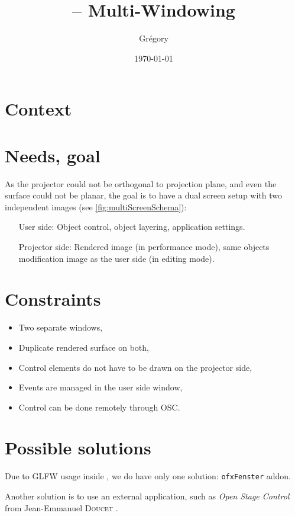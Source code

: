 \documentclass[a4paper,titlepage,oneside]{article}
\author{Grégory \bsc{David}}
\title{\vilain{} -- Multi-Windowing}
\date{\today{}}
\begin{document}
\maketitle{}
\tableofcontents{}
\newpage

\section{Context}


\section{Needs, goal}
As the projector could not be orthogonal to projection plane, and even
the surface could not be planar, the goal is to have a dual screen
setup with two independent images (see \figurename{}
\vref{fig:multiScreenSchema}):
\begin{enumerate}
    \item [User side:] Object control, object layering, application
    settings.
    \item [Projector side:] Rendered image (in performance mode), same
    objects modification image as the user side (in editing mode).
\end{enumerate}


\section{Constraints}
\begin{itemize}
    \item Two separate windows,
    \item Duplicate rendered surface on both,
    \item Control elements do not have to be drawn on the projector
    side,
    \item Events are managed in the user side window,
    \item Control can be done remotely through OSC.
\end{itemize}

\section{Possible solutions}
Due to GLFW usage inside \OF{}, we do have only one solution:
\texttt{ofxFenster} addon.

Another solution is to use an external application, such as \emph{Open
  Stage Control} from Jean-Emmanuel \textsc{Doucet}
\cite{OpenStageControl}.
\end{document}
